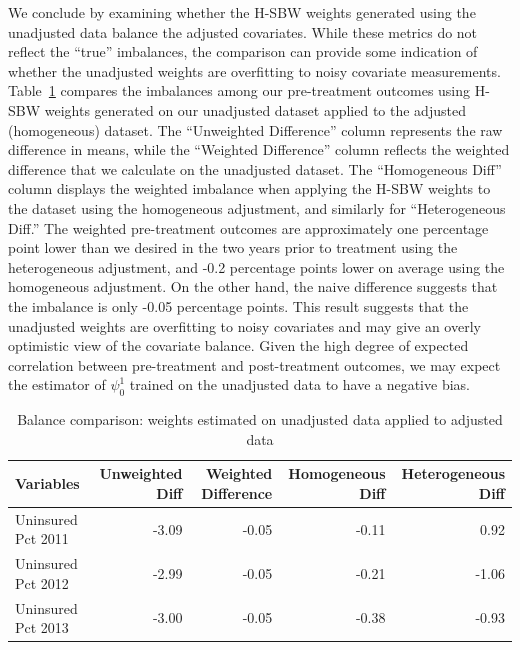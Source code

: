 We conclude by examining whether the H-SBW weights generated using the unadjusted data balance the adjusted covariates. While these metrics do not reflect the ``true'' imbalances, the comparison can provide some indication of whether the unadjusted weights are overfitting to noisy covariate measurements. Table~\ref{tab:balcomp} compares the imbalances among our pre-treatment outcomes using H-SBW weights generated on our unadjusted dataset applied to the adjusted (homogeneous) dataset. The ``Unweighted Difference'' column represents the raw difference in means, while the ``Weighted Difference'' column reflects the weighted difference that we calculate on the unadjusted dataset. The ``Homogeneous Diff'' column displays the weighted imbalance when applying the H-SBW weights to the dataset using the homogeneous adjustment, and similarly for ``Heterogeneous Diff.'' The weighted pre-treatment outcomes are approximately one percentage point lower than we desired in the two years prior to treatment using the heterogeneous adjustment, and -0.2 percentage points lower on average using the homogeneous adjustment. On the other hand, the naive difference suggests that the imbalance is only -0.05 percentage points. This result suggests that the unadjusted weights are overfitting to noisy covariates and may give an overly optimistic view of the covariate balance. Given the high degree of expected correlation between pre-treatment and post-treatment outcomes, we may expect the estimator of $\psi^1_0$ trained on the unadjusted data to have a negative bias.

\begin{table}[ht]
\caption{Balance comparison: weights estimated on unadjusted data applied to adjusted data}\label{tab:balcomp}
\begin{tabular}{lrrrr}
  \hline
Variables & Unweighted Diff & Weighted Difference & Homogeneous Diff & Heterogeneous Diff\\ 
  \hline
Uninsured Pct 2011 & -3.09 & -0.05 & -0.11 & 0.92 \\ 
  Uninsured Pct 2012 & -2.99 & -0.05 & -0.21 & -1.06 \\ 
  Uninsured Pct 2013 & -3.00 & -0.05 & -0.38 & -0.93 \\
  \hline
\end{tabular}
\end{table}
\clearpage